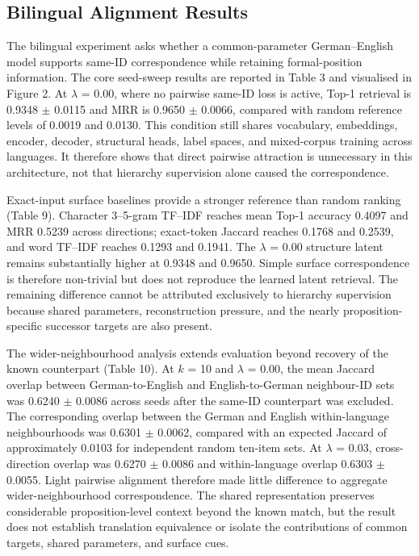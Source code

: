 \documentclass[webpdf,modern,medium,namedate]{oup-authoring-template}
\begin{document}
\subsection{Bilingual Alignment Results}
The bilingual experiment asks whether a common-parameter German--English model supports same-ID correspondence while retaining formal-position information. The core seed-sweep results are reported in Table 3 and visualised in Figure 2. At $\lambda$ = 0.00, where no pairwise same-ID loss is active, Top-1 retrieval is 0.9348 $\pm$ 0.0115 and MRR is 0.9650 $\pm$ 0.0066, compared with random reference levels of 0.0019 and 0.0130. This condition still shares vocabulary, embeddings, encoder, decoder, structural heads, label spaces, and mixed-corpus training across languages. It therefore shows that direct pairwise attraction is unnecessary in this architecture, not that hierarchy supervision alone caused the correspondence.

Exact-input surface baselines provide a stronger reference than random ranking (Table 9). Character 3--5-gram TF--IDF reaches mean Top-1 accuracy 0.4097 and MRR 0.5239 across directions; exact-token Jaccard reaches 0.1768 and 0.2539, and word TF--IDF reaches 0.1293 and 0.1941. The $\lambda$ = 0.00 structure latent remains substantially higher at 0.9348 and 0.9650. Simple surface correspondence is therefore non-trivial but does not reproduce the learned latent retrieval. The remaining difference cannot be attributed exclusively to hierarchy supervision because shared parameters, reconstruction pressure, and the nearly proposition-specific successor targets are also present.

The wider-neighbourhood analysis extends evaluation beyond recovery of the known counterpart (Table 10). At $k$ = 10 and $\lambda$ = 0.00, the mean Jaccard overlap between German-to-English and English-to-German neighbour-ID sets was 0.6240 $\pm$ 0.0086 across seeds after the same-ID counterpart was excluded. The corresponding overlap between the German and English within-language neighbourhoods was 0.6301 $\pm$ 0.0062, compared with an expected Jaccard of approximately 0.0103 for independent random ten-item sets. At $\lambda$ = 0.03, cross-direction overlap was 0.6270 $\pm$ 0.0086 and within-language overlap 0.6303 $\pm$ 0.0055. Light pairwise alignment therefore made little difference to aggregate wider-neighbourhood correspondence. The shared representation preserves considerable proposition-level context beyond the known match, but the result does not establish translation equivalence or isolate the contributions of common targets, shared parameters, and surface cues.
\end{document}
